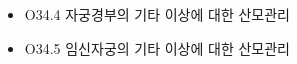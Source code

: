 \begin{enumerate}[가)]
\begin{itemize}
	\item O34.4	자궁경부의 기타 이상에 대한 산모관리	 
	\item O34.5	임신자궁의 기타 이상에 대한 산모관리	 

\end{itemize}
\end{enumerate}
